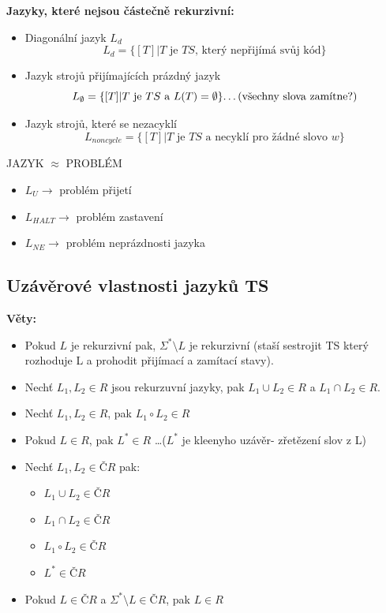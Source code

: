 \documentclass[10pt,a4paper]{article}
\theoremstyle{note}
\begin{document}
		\textbf{Jazyky, které nejsou částečně rekurzivní:}

		\begin{itemize}
			\item Diagonální jazyk $L_{d}$ $$L_{d} = \{[T]| T \text{ je } TS \text{, který nepřijímá svůj kód} \}$$
			\item Jazyk strojů přijímajících prázdný jazyk
				$$L_{\emptyset} = \{[T]| T \text{ je } TS \text{ a } L(T) =
						\emptyset \} \text{\dots(všechny slova zamítne?)}$$
			\item Jazyk strojů, které se nezacyklí
				$$L_{noncycle} = \{ [T]| T \text{ je } TS \text{ a necyklí pro žádné slovo } w\}$$
		\end{itemize}

		\vspace{1cm}
		JAZYK $\approx$ PROBLÉM

		\begin{itemize}
			\item $L_{U} \rightarrow$ problém přijetí
			\item $L_{HALT} \rightarrow$ problém zastavení
			\item $L_{NE} \rightarrow$ problém neprázdnosti jazyka
		\end{itemize}
		\vspace{1cm}


	\subsection{Uzávěrové vlastnosti jazyků TS}

	\textbf{Věty:}
		\begin{itemize}
			\item Pokud $L$ je rekurzivní pak, $\Sigma^{*} \setminus  L$ je rekurzivní (staší sestrojit TS který rozhoduje L
				a prohodit přijímací a zamítací stavy).
			\item Nechť $L_{1}, L_{2} \in R$ jsou rekurzuvní jazyky, pak $L_{1} \cup L_{2} \in R$  a  $L_{1} \cap L_{2} \in R$.
			\item Nechť $L_{1},L_{2} \in R$, pak $L_{1} \circ  L_{2}\in R$
			\item Pokud $L \in R$, pak $L^{*} \in R$ \dots($L^{*}$ je kleenyho uzávěr- zřetězení slov z L)



			\item Nechť $L_{1}, L_{2} \in ČR$ pak:
				\begin{itemize}
					\item $L_{1} \cup L_{2} \in ČR$
					\item $L_{1} \cap L_{2} \in ČR$
					\item $L_{1} \circ L_{2} \in ČR$
					\item $L^{*} \in ČR$
				\end{itemize}
			\item Pokud $L \in ČR$ a  $\Sigma^{*} \setminus  L \in ČR$, pak $L \in R$

		\end{itemize}
\end{document}
